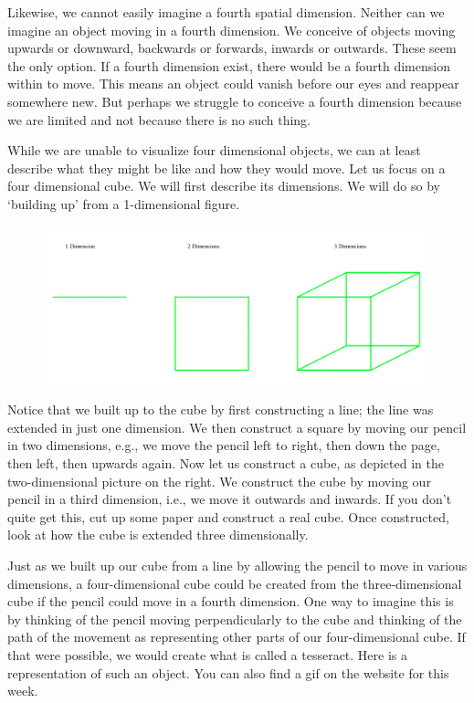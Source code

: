 \documentclass[oneside]{article}
\begin{document}
Likewise, we cannot easily imagine a fourth spatial dimension. Neither can we imagine an object moving in a fourth dimension. We conceive of objects moving upwards or downward, backwards or forwards, inwards or outwards. These seem the only option. If a fourth dimension exist, there would be a fourth dimension within to move. This means an object could vanish before our eyes and reappear somewhere new. But perhaps we struggle to conceive a fourth dimension because we are limited and not because there is no such thing. 

While we are unable to  visualize four dimensional objects, we can at least describe what they might be like and how they would move. Let us focus on a four dimensional cube. We will first describe its dimensions. We will do so by `building up' from a 1-dimensional figure. 

\begin{figure}[h]
  \includegraphics[width=\linewidth]{dimensions.jpg}
\end{figure}


Notice that we built up to the cube by first constructing a line; the line was extended in just one dimension. We then construct a square by moving our pencil in two dimensions, e.g., we move the pencil left to right, then down the page, then left, then upwards again. Now let us construct a cube, as depicted in the two-dimensional picture on the right. We construct the cube by moving our pencil in a third dimension, i.e., we move it outwards and inwards. If you don't quite get this, cut up some paper and construct a real cube. Once constructed, look at how the cube is extended three dimensionally. 

Just as we built up our cube from a line by allowing the pencil to move in various dimensions, a four-dimensional cube could be created from the three-dimensional cube if the pencil could move in a fourth dimension. One way to imagine this is by thinking of the pencil moving perpendicularly to the cube and thinking of the path of the movement as representing other parts of our four-dimensional cube. If that were possible, we would create what is called a tesseract. Here is a representation of such an object. You can also find a gif on the website for this week.
\end{document}

